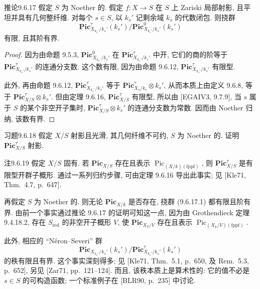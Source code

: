 \begin{origstatement}{推论}{9.6.17}\label{ch09s6:cor9617}
假定 $S$ 为 Noether 的. 假定 $f:X\to S$ 在 $S$ 上 Zariski 局部射影, 且平坦并具有几何整纤维. 对每个 $s\in S$, 以 $k_s'$ 记剩余域 $k_s$ 的代数闭包. 则挠群
\begin{equation}\mathbf{Pic}_{X_{k_s'}/k_s'}^{\tau}(k_s')\big/\mathbf{Pic}_{X_{k_s'}/k_s'}^0(k_s')\tag{9.6.17.1}\label{ch09s6:eq96171}\end{equation}
有限, 且其阶有界.
\end{origstatement}
\begin{proof}
因为由命题 9.5.3, $\mathbf{Pic}_{X_{k_s'}/k_s'}^0$ 在 $\mathbf{Pic}_{X_{k_s'}/k_s'}^{\tau}$ 中开, 它们的商的阶等于 $\mathbf{Pic}_{X_{k_s'}/k_s'}^{\tau}$ 的连通分支数. 这个数有限, 因为由命题 9.6.12, $\mathbf{Pic}_{X_{k_s'}/k_s'}^{\tau}$ 有限型.

此外, 再由命题 9.6.12, $\mathbf{Pic}_{X_{k_s'}/k_s'}^{\tau}$ 等于 $\mathbf{Pic}_{X_s/k_s}^{\tau}\otimes k_s'$, 从而本质上由定义 9.6.8, 等于 $\mathbf{Pic}_{X/S}^{\tau}\otimes k_s'$. 但由定理 9.6.16, $\mathbf{Pic}_{X/S}^{\tau}$ 有限型, 所以由 [EGAIV3, 9.7.9], 当 $s$ 属于 $S$ 的某个非空开子集时, $\mathbf{Pic}_{X/S}^{\tau}\otimes k_s'$ 的连通分支数为常数. 因而由 Noether 归纳, 该数有界.
\end{proof}

\begin{origstatement}{习题}{9.6.18}\label{ch09s6:ex9618}
假定 $X/S$ 射影且光滑, 其几何纤维不可约, $S$ 为 Noether 的. 证明 $\mathbf{Pic}_{X/S}^{\tau}$ 射影.
\end{origstatement}

\begin{origstatement}{注}{9.6.19}\label{ch09s6:rem9619}
假定 $X/S$ 固有. 若 $\mathbf{Pic}_{X/S}$ 存在且表示 $\operatorname{Pic}_{(X/k)(\mathrm{fppf})}$, 则 $\mathbf{Pic}_{X/S}^{\tau}$ 是有限型开群子概形. 通过一系列归约步骤, 可由定理 9.6.16 导出此事实; 见 [Kle71, Thm.~4.7, p.~647].

再假定 $S$ 为 Noether 的. 则无论 $\mathbf{Pic}_{X/k}$ 是否存在, 挠群 (9.6.17.1) 都有限且阶有界. 由前一个事实通过推论 9.6.17 的证明可知这一点, 因为由 Grothendieck 定理 9.4.18.2, 存在 $S_{\mathrm{red}}$ 的非空开子概形 $V$, 使 $\mathbf{Pic}_{X_V/V}$ 存在且表示 $\operatorname{Pic}_{(X_V/V)(\mathrm{fppf})}$.

此外, 相应的 ``Néron--Severi'' 群
\[\mathbf{Pic}_{X_{k_s'}/k_s'}(k_s')\big/\mathbf{Pic}_{X_{k_s'}/k_s'}^{\tau}(k_s')\]
的秩有限且有界. 这个事实深刻得多; 见 [Kle71, Thm.~5.1, p.~650, 及 Rem.~5.3, p.~652], 另见 [Zar71, pp.~121--124]. 而且, 该秩本质上是算术性的: 它的值不必是 $s\in S$ 的可构造函数; 一个标准例子在
[BLR90, p.~235] 中讨论.
\end{origstatement}

